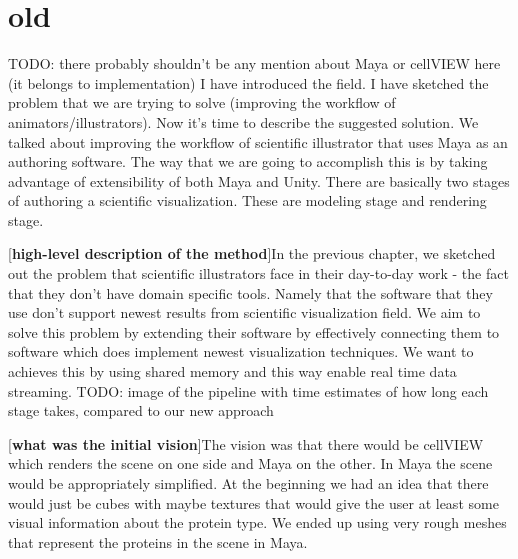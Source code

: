 \documentclass[
  digital, %
  table,   %
  nolof,     %
  nolot,     %
]{fithesis3}
\begin{document}
\section{old}
TODO: there probably shouldn't be any mention about Maya or cellVIEW here (it belongs to implementation)
I have introduced the field. I have sketched the problem that we are trying to solve (improving the workflow of animators/illustrators). Now it's time to describe the suggested solution.
We talked about improving the workflow of scientific illustrator that uses Maya as an authoring software. The way that we are going to accomplish this is by taking advantage of extensibility of both Maya and Unity. 
There are basically two stages of authoring a scientific visualization. These are modeling stage and rendering stage.

[\textbf{high-level description of the method}]In the previous chapter, we sketched out the problem that scientific illustrators face in their day-to-day work - the fact that they don't have domain specific tools. Namely that the software that they use don't support newest results from scientific visualization field. We aim to solve this problem by extending their software by effectively connecting them to software which does implement newest visualization techniques. We want to achieves this by using shared memory and this way enable real time data streaming.
TODO: image of the pipeline with time estimates of how long each stage takes, compared to our new approach

[\textbf{what was the initial vision}]The vision was that there would be cellVIEW which renders the scene on one side and Maya on the other. In Maya the scene would be appropriately simplified. At the beginning we had an idea that there would just be cubes with maybe textures that would give the user at least some visual information about the protein type. We ended up using very rough meshes that represent the proteins in the scene in Maya.
\end{document}
